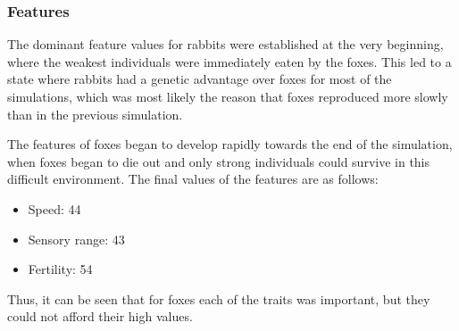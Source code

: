 \subsubsection{Features}
The dominant feature values for rabbits were established at the very beginning, where the weakest individuals were immediately eaten by the foxes. This led to a state where rabbits had a genetic advantage over foxes for most of the simulations, which was most likely the reason that foxes reproduced more slowly than in the previous simulation. 

The features of foxes began to develop rapidly towards the end of the simulation, when foxes began to die out and only strong individuals could survive in this difficult environment. The final values of the features are as follows: 
\begin{itemize}
    \item Speed: 44
    \item Sensory range: 43
    \item Fertility: 54
\end{itemize}
Thus, it can be seen that for foxes each of the traits was important, but they could not afford their high values. 